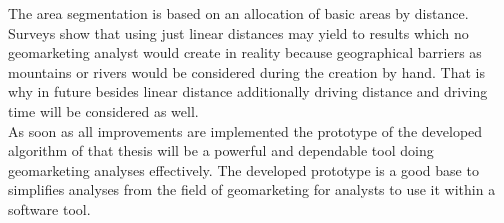 The area segmentation is based on an allocation of basic areas by distance. Surveys show that using just linear distances may yield to results which no geomarketing analyst would create in reality because geographical barriers as mountains or rivers would be considered during the creation by hand. That is why in future besides linear distance additionally driving distance and driving time will be considered as well. \\
As soon as all improvements are implemented the prototype of the developed algorithm of that thesis will be a powerful and dependable tool doing geomarketing analyses effectively. The developed prototype is a good base to simplifies analyses from the field of geomarketing for analysts to use it within a software tool.
